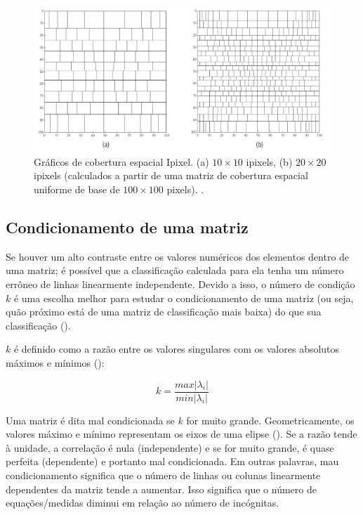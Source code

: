 \documentclass[a4paper, 12 pt]{article} %
\begin{document}
\begin{figure}[!hbtp]
	\begin{center}
		\includegraphics[scale=0.44]{Figuras/ipixel.png}
	\end{center}
	\caption{Gráficos de cobertura espacial Ipixel. (a) $10 \times 10$ ipixels, (b) $20 \times 20$ ipixels (calculados a partir de uma matriz de cobertura espacial  uniforme de base de $100 \times 100$ pixels). \cite{RBGf1495}.}
	\label{ipixel}
\end{figure} \newpage


\subsection{Condicionamento de uma matriz}

Se houver um alto contraste entre os valores numéricos dos elementos dentro de uma matriz; é possível que a classificação calculada para ela tenha um número errôneo de linhas linearmente independente. Devido a isso, o número de condição $k$ é uma escolha melhor para estudar o condicionamento de uma matriz (ou seja, quão próximo está de uma matriz de classificação mais baixa) do que sua classificação (\citealp{strang1980linear}).

$k$ é definido como a razão entre os valores singulares com os valores absolutos máximos e mínimos (\citealp{computations1989johns}):

\begin{equation}\label{eq:k_equation}
k = \frac{max|\lambda _{i}|}{min |\lambda _{i}|}
\end{equation}

Uma matriz é dita mal condicionada se $k$ for muito grande. Geometricamente, os valores máximo e mínimo representam os eixos de uma elipse (\citealp{branham1990introduction}). Se a razão tende à unidade, a correlação é nula (independente) e se for muito grande, é quase perfeita (dependente) e portanto mal condicionada. Em outras palavras, mau condicionamento significa que o número de linhas ou colunas linearmente dependentes da matriz tende a aumentar. Isso significa que o número de equações/medidas diminui em relação ao número de incógnitas.
\end{document}

